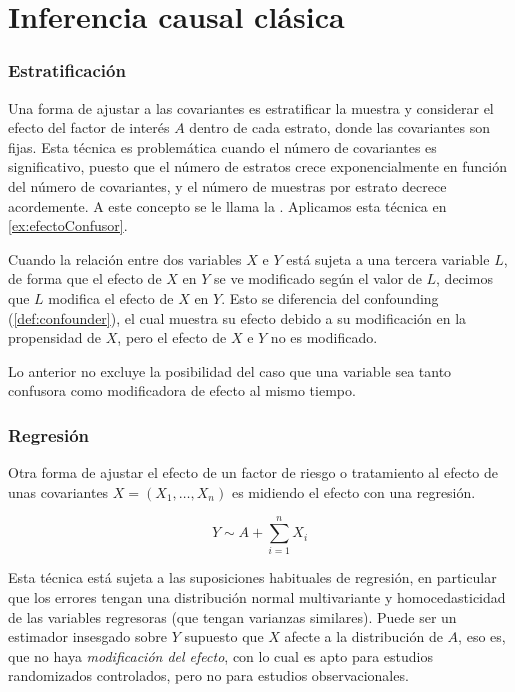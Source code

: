 \chapter{Inferencia causal clásica}
\cite{oxChapterOutcome}

\subsection{Estratificación}
Una forma de ajustar a las covariantes es estratificar la muestra y considerar
el efecto del factor de interés $A$ dentro de cada estrato, donde las covariantes
son fijas.
Esta técnica es problemática cuando el número de covariantes es significativo,
puesto que el número de estratos crece exponencialmente en función del número de covariantes,
y el número de muestras por estrato decrece acordemente.
A este concepto se le llama la \footnotemark{}.
Aplicamos esta técnica en \autoref{ex:efectoConfusor}.

\begin{definicion} \label{def:modificacion_de_efecto}
    Cuando la relación entre dos variables $X$ e $Y$ está sujeta a una tercera variable
    $L$, de forma que el efecto de $X$ en $Y$ se ve modificado según el valor de $L$,
    decimos que $L$ modifica el efecto de $X$ en $Y$.
    Esto se diferencia del confounding (\autoref{def:confounder}), el cual muestra su efecto
    debido a su modificación en la propensidad de $X$, pero el efecto de $X$ e $Y$ no es
    modificado.
\end{definicion}
\begin{nota}
    Lo anterior no excluye la posibilidad del caso que una variable sea tanto
    confusora como modificadora de efecto al mismo tiempo.
\end{nota}


\subsection{Regresión}
Otra forma de ajustar el efecto de un factor de riesgo o tratamiento
al efecto de unas covariantes $X = (X_1, \ldots, X_n)$ es midiendo el efecto con una regresión.

$$
    Y \sim A + \sum_{i=1}^{n} X_i
$$

Esta técnica está sujeta a las suposiciones habituales de regresión, en particular
que los errores tengan una distribución normal multivariante y homocedasticidad de
las variables regresoras (que tengan varianzas similares).
Puede ser un estimador insesgado sobre $Y$ supuesto que $X$ afecte a la distribución de $A$,
eso es, que no haya \emph{modificación del efecto}, con lo cual es apto para estudios randomizados
controlados, pero no para estudios observacionales.
